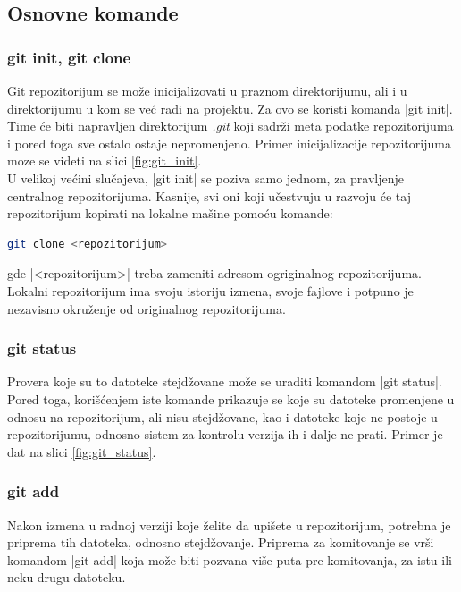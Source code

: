 \documentclass[a4paper]{article}
\begin{document}
{\subsection{Osnovne komande}
\label{osnovne_komande}


\subsubsection*{git init, git clone}

Git repozitorijum se može inicijalizovati u praznom direktorijumu, ali i u direktorijumu u kom se već radi na projektu. Za ovo se koristi komanda |git init|. Time će biti napravljen direktorijum \textit{.git} koji sadrži meta podatke repozitorijuma i pored toga sve ostalo ostaje nepromenjeno. Primer inicijalizacije repozitorijuma moze se videti na slici \ref{fig:git_init}.\\

U velikoj većini slučajeva, |git init| se poziva samo jednom, za pravljenje centralnog repozitorijuma. Kasnije, svi oni koji učestvuju u razvoju će taj repozitorijum kopirati na lokalne mašine pomoću komande:
\begin{lstlisting}[language=bash]
git clone <repozitorijum>
\end{lstlisting}

gde |<repozitorijum>| treba zameniti adresom ogriginalnog repozitorijuma. Lokalni repozitorijum ima svoju istoriju izmena, svoje fajlove i potpuno je nezavisno okruženje od originalnog repozitorijuma. 


\subsubsection*{git status}
\label{subsec:git_status}
Provera koje su to datoteke stejdžovane može se uraditi komandom |git status|. Pored toga, korišćenjem iste komande prikazuje se koje su datoteke promenjene u odnosu na repozitorijum, ali nisu stejdžovane, kao i datoteke koje ne postoje u repozitorijumu, odnosno sistem za kontrolu verzija ih i dalje ne prati. Primer je dat na slici \ref{fig:git_status}.

\subsubsection*{git add}
\label{subsec:git_add}
Nakon izmena u radnoj verziji koje želite da upišete u repozitorijum, potrebna je priprema tih datoteka, odnosno stejdžovanje. Priprema za komitovanje se vrši komandom |git add| koja može biti pozvana više puta pre komitovanja, za istu ili neku drugu datoteku.


}
\end{document}
